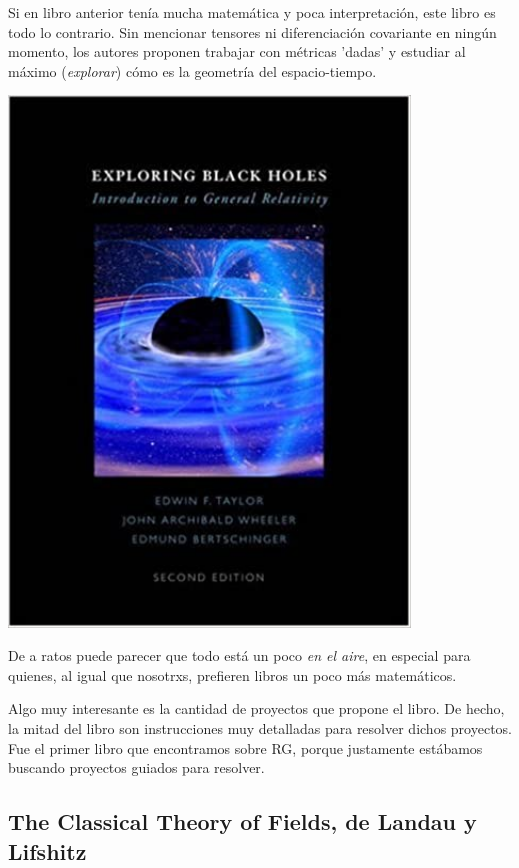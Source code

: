 Si en libro anterior tenía mucha matemática y poca interpretación, este libro es todo lo contrario. Sin mencionar tensores ni diferenciación covariante en ningún momento, los autores proponen trabajar con métricas 'dadas' y estudiar al máximo (\textit{explorar}) cómo es la geometría del espacio-tiempo. 
\begin{marginfigure}
\includegraphics[width=0.8\textwidth]{Im/wheeler.jpg}
\end{marginfigure}
De a ratos puede parecer que todo está un poco \textit{en el aire}, en especial para quienes, al igual que nosotrxs, prefieren libros un poco más matemáticos. 

Algo muy interesante es la cantidad de proyectos que propone el libro. De hecho, la mitad del libro son instrucciones muy detalladas para resolver dichos proyectos. Fue el primer libro que encontramos sobre RG, porque justamente estábamos buscando proyectos guiados para resolver.

\subsection*{\textbf{The Classical Theory of Fields}, de Landau y Lifshitz}


